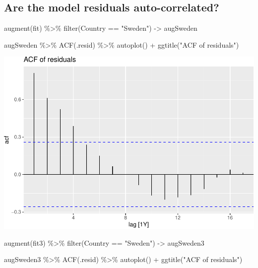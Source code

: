 \documentclass[
]{book}
\newenvironment{Shaded}{\begin{snugshade}}{\end{snugshade}}
\newcommand{\FunctionTok}[1]{\textcolor[rgb]{0.00,0.00,0.00}{#1}}
\newcommand{\NormalTok}[1]{#1}
\newcommand{\OtherTok}[1]{\textcolor[rgb]{0.56,0.35,0.01}{#1}}
\newcommand{\SpecialCharTok}[1]{\textcolor[rgb]{0.00,0.00,0.00}{#1}}
\newcommand{\StringTok}[1]{\textcolor[rgb]{0.31,0.60,0.02}{#1}}
\begin{document}
\hypertarget{are-the-model-residuals-auto-correlated}{%
\subsection{Are the model residuals auto-correlated?}\label{are-the-model-residuals-auto-correlated}}

\begin{Shaded}
\begin{Highlighting}[]
\FunctionTok{augment}\NormalTok{(fit) }\SpecialCharTok{\%\textgreater{}\%} \FunctionTok{filter}\NormalTok{(Country }\SpecialCharTok{==} \StringTok{"Sweden"}\NormalTok{) }\OtherTok{{-}\textgreater{}}\NormalTok{ augSweden}

\NormalTok{augSweden }\SpecialCharTok{\%\textgreater{}\%}
  \FunctionTok{ACF}\NormalTok{(.resid) }\SpecialCharTok{\%\textgreater{}\%}
  \FunctionTok{autoplot}\NormalTok{() }\SpecialCharTok{+} \FunctionTok{ggtitle}\NormalTok{(}\StringTok{"ACF of residuals"}\NormalTok{)}
\end{Highlighting}
\end{Shaded}

\includegraphics{graphics/unnamed-chunk-36-1.pdf}

\begin{Shaded}
\begin{Highlighting}[]
\FunctionTok{augment}\NormalTok{(fit3) }\SpecialCharTok{\%\textgreater{}\%} \FunctionTok{filter}\NormalTok{(Country }\SpecialCharTok{==} \StringTok{"Sweden"}\NormalTok{) }\OtherTok{{-}\textgreater{}}\NormalTok{ augSweden3}

\NormalTok{augSweden3 }\SpecialCharTok{\%\textgreater{}\%}
  \FunctionTok{ACF}\NormalTok{(.resid) }\SpecialCharTok{\%\textgreater{}\%}
  \FunctionTok{autoplot}\NormalTok{() }\SpecialCharTok{+} \FunctionTok{ggtitle}\NormalTok{(}\StringTok{"ACF of residuals"}\NormalTok{)}
\end{Highlighting}
\end{Shaded}
\end{document}
